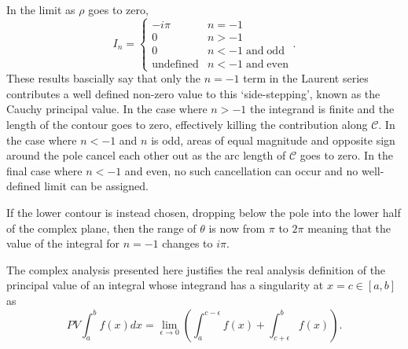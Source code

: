 \begin{textblock*}{100mm}
\[\]
In the limit as $\rho$ goes to zero,
\[
   I_n = \left\{ \begin{array}{ll} 
                     -i \pi              & n = -1                        \\ 
                      0                  & n > -1                        \\
                      0                  & n < -1 \; \mathrm{and \; odd} \\ 
                      \mathrm{undefined} & n < -1 \; \mathrm{and \; even} 
                 \end{array} \right. .
\] 
These results bascially say that only the $n = -1$ term in the Laurent series 
contributes a well defined non-zero value to this `side-stepping', known as the 
Cauchy principal value. In the case where $n>-1$ the integrand is finite and the length
of the contour goes to zero, effectively killing the contribution along $\mathcal C$.
In the case where $n<-1$ and $n$ is odd, areas of equal magnitude and opposite sign
around the pole cancel each other out as the arc length of $\mathcal C$ goes to zero.
In the final case where $n<-1$ and even, no such cancellation can occur and no well-defined
limit can be assigned.

If the lower contour is instead chosen, dropping below the pole into the lower half
of the complex plane, then the range of $\theta$ is now from $\pi$ to $2\pi$ meaning
that the value of the integral for $n=-1$ changes to $i \pi$. 

The complex analysis presented here justifies the real analysis definition of the principal value
of an integral whose integrand has a singularity at $x=c \in [a,b]$ as
\[
   PV \int_{a}^{b} f(x) dx = \lim_{\epsilon \rightarrow 0} \left( \int_{a}^{c-\epsilon} f(x) + \int_{c+\epsilon}^{b} f(x) \right) .
\]
\end{textblock*}

\newpage

